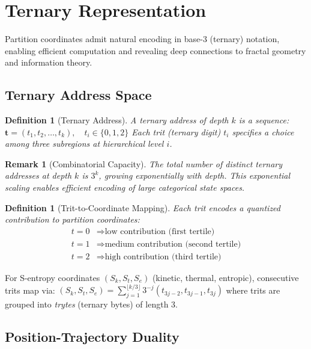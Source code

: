 \documentclass[twocolumn,10pt]{article}
\newtheorem{definition}[theorem]{Definition}
\newtheorem{remark}[theorem]{Remark}
\begin{document}
\section{Ternary Representation}
\label{sec:ternary}

Partition coordinates admit natural encoding in base-3 (ternary) notation, enabling efficient computation and revealing deep connections to fractal geometry and information theory.

\subsection{Ternary Address Space}

\begin{definition}[Ternary Address]
\label{def:ternary}
A \emph{ternary address} of depth $k$ is a sequence:
$
\mathbf{t} = (t_1, t_2, \ldots, t_k), \quad t_i \in \{0, 1, 2\}
$
Each \emph{trit} (ternary digit) $t_i$ specifies a choice among three subregions at hierarchical level $i$.
\end{definition}

\begin{remark}[Combinatorial Capacity]
The total number of distinct ternary addresses at depth $k$ is $3^k$, growing exponentially with depth. This exponential scaling enables efficient encoding of large categorical state spaces.
\end{remark}

\begin{definition}[Trit-to-Coordinate Mapping]
\label{def:trit_map}
Each trit encodes a quantized contribution to partition coordinates:
\begin{align}
t = 0 &\Rightarrow \text{low contribution (first tertile)} \\
t = 1 &\Rightarrow \text{medium contribution (second tertile)} \\
t = 2 &\Rightarrow \text{high contribution (third tertile)}
\end{align}
\end{definition}

For S-entropy coordinates $(S_k, S_t, S_e)$ (kinetic, thermal, entropic), consecutive trits map via:
$
(S_k, S_t, S_e) = \sum_{j=1}^{\lfloor k/3 \rfloor} 3^{-j} (t_{3j-2}, t_{3j-1}, t_{3j})
$
where trits are grouped into \emph{trytes} (ternary bytes) of length 3.

\subsection{Position-Trajectory Duality}
\end{document}
